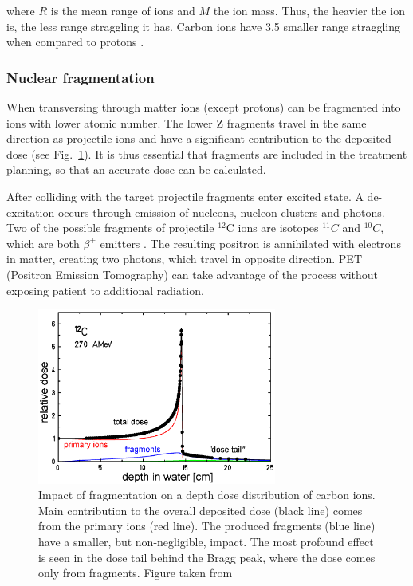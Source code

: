 where $R$ is the mean range of ions and $M$ the ion mass. Thus, the heavier the ion is, the less range straggling it has. Carbon ions have 3.5 smaller range straggling when compared to protons \cite{Schardt2010}.

\subsubsection{Nuclear fragmentation}
\label{nuclfrag}

When transversing through matter ions (except protons) can be fragmented into ions with lower atomic number. The lower Z fragments travel in the same direction as projectile ions and 
have a significant contribution to the deposited dose (see Fig.~\ref{iondd}). It is thus essential that fragments are included in the treatment planning, so that an accurate dose can be calculated.

After colliding with the target projectile fragments enter excited state. A de-excitation occurs through
emission of nucleons, nucleon clusters and photons. Two of the possible fragments of projectile $^{12}$C ions are isotopes $^{11}C$ and $^{10}C$, which are both $\beta^+$ emitters \cite{Kraft2000}.
The resulting positron is annihilated with electrons in matter, creating two photons, which travel in opposite direction. PET (Positron Emission Tomography) can take advantage of the process without exposing patient to additional radiation.

\begin{figure}[H]
\begin{center}
\includegraphics[width=0.7\textwidth]{./Fundamentals/Images/iondepthdosesum.png}
\caption{Impact of fragmentation on a depth dose distribution of carbon ions. Main contribution to the overall deposited dose (black line) comes from the primary ions (red line). The produced fragments 
(blue line) have a smaller, but non-negligible, impact. The most profound effect is seen in the dose tail behind the Bragg peak, where the dose comes only from fragments. Figure taken from \cite{Groezinger2004}}
\label{iondd}
\end{center}
\end{figure}

